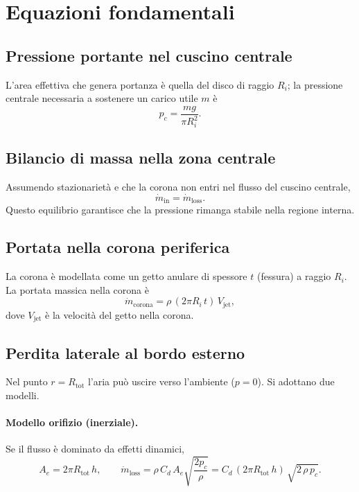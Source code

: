 \documentclass[11pt,a4paper]{article}
\begin{document}
\section{Equazioni fondamentali}

\subsection{Pressione portante nel cuscino centrale}
L'area effettiva che genera portanza è quella del disco di raggio \(R_i\); la pressione centrale necessaria a sostenere un carico utile \(m\) è
\begin{equation}
  p_c = \frac{m g}{\pi R_i^2}.
\end{equation}

\subsection{Bilancio di massa nella zona centrale}
Assumendo stazionarietà e che la corona non entri nel flusso del cuscino centrale,
\begin{equation}
  \dot{m}_{\mathrm{in}} = \dot{m}_{\mathrm{loss}}.
\end{equation}
Questo equilibrio garantisce che la pressione rimanga stabile nella regione interna.

\subsection{Portata nella corona periferica}
La corona è modellata come un getto anulare di spessore \(t\) (fessura) a raggio \(R_i\). La portata massica nella corona è
\begin{equation}
  \dot{m}_{\mathrm{corona}} = \rho \, (2\pi R_i\, t)\, V_{\mathrm{jet}},
\end{equation}
dove \(V_{\mathrm{jet}}\) è la velocità del getto nella corona.

\subsection{Perdita laterale al bordo esterno}
Nel punto \(r = R_{\mathrm{tot}}\) l'aria può uscire verso l'ambiente (\(p=0\)). Si adottano due modelli.

\paragraph{Modello orifizio (inerziale).}
Se il flusso è dominato da effetti dinamici,
\begin{equation}
  A_e = 2\pi R_{\mathrm{tot}}\, h, 
  \qquad
  \dot{m}_{\mathrm{loss}} = \rho\, C_d\, A_e \sqrt{\frac{2 p_c}{\rho}}
  = C_d\, (2\pi R_{\mathrm{tot}}\, h)\, \sqrt{2\,\rho\,p_c}.
\end{equation}
\end{document}
